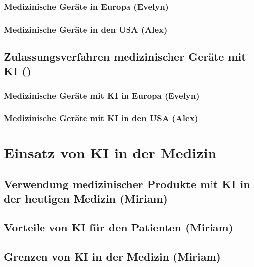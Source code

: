 \documentclass[a4paper, 11pt]{article}
\begin{document}
			\subsubsection{Medizinische Geräte in Europa \small{(Evelyn)}}\label{sec:europe-no-ai}
				
			\subsubsection{Medizinische Geräte in den USA \small{(Alex)}}\label{sec:us-no-ai}
					
		\subsection{Zulassungsverfahren medizinischer Geräte mit KI \small{()}}\label{sec:medproductsAI}
						
			\subsubsection{Medizinische Geräte mit KI in Europa \small{(Evelyn)}}\label{sec:europe-with-ai}
				
			\subsubsection{Medizinische Geräte mit KI in den USA \small{(Alex)}}\label{sec:us-with-ai}
				
				
				

	\newpage
	\section{Einsatz von KI in der Medizin}\label{sec:analysis}
				
			\subsection{Verwendung medizinischer Produkte mit KI in der heutigen Medizin \small{(Miriam)}}\label{sec:ki-today}
				
			\subsection{Vorteile von KI für den Patienten \small{(Miriam)}}\label{sec:ki-advantages}
				
			\subsection{Grenzen von KI in der Medizin  \small{(Miriam)}}\label{sec:ki-limitations}
				
	\newpage
\end{document}
